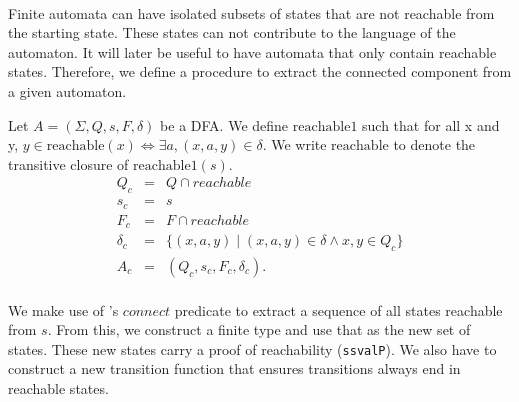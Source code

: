     \paragraph{} 
    Finite automata can have isolated subsets of states that are not reachable from the starting state. 
    These states can not contribute to the language of the automaton. 
    It will later be useful to have automata that only contain reachable states. 
    Therefore, we define a procedure to extract the connected component from a given automaton.

    \begin{definition}
        Let $A = (\Sigma, Q, s, F, \delta)$ be a DFA.
        We define $\mathrm{reachable1}$ such that for all x and y, 
        $y \in \mathrm{reachable}(x) \iff \exists a, (x,a,y) \in \delta$.
        We write $\mathrm{reachable}$ to denote the transitive closure of $\mathrm{reachable1}(s)$.
        \begin{eqnarray*}
            Q_c & = & Q \cap reachable \\
            s_c & = & s \\
            F_c & = & F \cap reachable \\
            \delta_c & = & \{(x, a, y) \; | \; (x, a, y) \in \delta \wedge x,y \in Q_c \} \\
            A_c &=& (Q_c, s_c, F_c, \delta_c).
        \end{eqnarray*}
    \end{definition}

    \paragraph{}
    We make use of \ssreflect's $connect$ predicate to extract a sequence of all states reachable from $s$. 
    From this, we construct a finite type and use that as the new set of states. 
    These new states carry a proof of reachability (\lstinline{ssvalP}).
    We also have to construct a new transition function that ensures transitions always end in reachable states.



